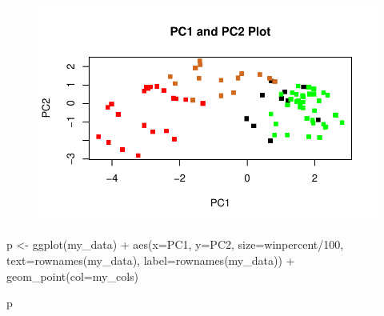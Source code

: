 \documentclass[
  letterpaper,
  DIV=11,
  numbers=noendperiod]{scrartcl}
\newenvironment{Shaded}{\begin{snugshade}}{\end{snugshade}}
\newcommand{\AttributeTok}[1]{\textcolor[rgb]{0.40,0.45,0.13}{#1}}
\newcommand{\CommentTok}[1]{\textcolor[rgb]{0.37,0.37,0.37}{#1}}
\newcommand{\DecValTok}[1]{\textcolor[rgb]{0.68,0.00,0.00}{#1}}
\newcommand{\FunctionTok}[1]{\textcolor[rgb]{0.28,0.35,0.67}{#1}}
\newcommand{\NormalTok}[1]{\textcolor[rgb]{0.00,0.23,0.31}{#1}}
\newcommand{\OtherTok}[1]{\textcolor[rgb]{0.00,0.23,0.31}{#1}}
\newcommand{\SpecialCharTok}[1]{\textcolor[rgb]{0.37,0.37,0.37}{#1}}
\begin{document}
\begin{figure}[H]

{\centering \includegraphics{class10_files/figure-pdf/unnamed-chunk-30-1.pdf}

}

\end{figure}

\begin{Shaded}
\end{Shaded}

\begin{Shaded}
\begin{Highlighting}[]
\NormalTok{p }\OtherTok{\textless{}{-}} \FunctionTok{ggplot}\NormalTok{(my\_data) }\SpecialCharTok{+} 
        \FunctionTok{aes}\NormalTok{(}\AttributeTok{x=}\NormalTok{PC1, }\AttributeTok{y=}\NormalTok{PC2, }
            \AttributeTok{size=}\NormalTok{winpercent}\SpecialCharTok{/}\DecValTok{100}\NormalTok{,  }
            \AttributeTok{text=}\FunctionTok{rownames}\NormalTok{(my\_data),}
            \AttributeTok{label=}\FunctionTok{rownames}\NormalTok{(my\_data)) }\SpecialCharTok{+}
        \FunctionTok{geom\_point}\NormalTok{(}\AttributeTok{col=}\NormalTok{my\_cols)}

\NormalTok{p}
\end{Highlighting}
\end{Shaded}
\end{document}
